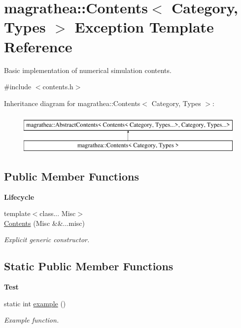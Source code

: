 \hypertarget{exceptionmagrathea_1_1Contents}{\section{magrathea\-:\-:Contents$<$ Category, Types $>$ Exception Template Reference}
\label{exceptionmagrathea_1_1Contents}
}


Basic implementation of numerical simulation contents.  




{\ttfamily \#include $<$contents.\-h$>$}

Inheritance diagram for magrathea\-:\-:Contents$<$ Category, Types $>$\-:\begin{figure}[H]
\begin{center}
\leavevmode
\includegraphics[height=2.000000cm]{exceptionmagrathea_1_1Contents}
\end{center}
\end{figure}
\subsection*{Public Member Functions}
\begin{Indent}{\bf Lifecycle}\par
\begin{DoxyCompactItemize}
\item 
{\footnotesize template$<$class... Misc$>$ }\\\hyperlink{exceptionmagrathea_1_1Contents_aa0080832edcbe9c2474b5d7915b8501b}{Contents} (Misc \&\&...misc)
\begin{DoxyCompactList}\small\item\em Explicit generic constructor. \end{DoxyCompactList}\end{DoxyCompactItemize}
\end{Indent}
\subsection*{Static Public Member Functions}
\begin{Indent}{\bf Test}\par
\begin{DoxyCompactItemize}
\item 
static int \hyperlink{exceptionmagrathea_1_1Contents_ae1b37bdd1b2f021c3ff26c17c912b9b3}{example} ()
\begin{DoxyCompactList}\small\item\em Example function. \end{DoxyCompactList}\end{DoxyCompactItemize}
\end{Indent}
